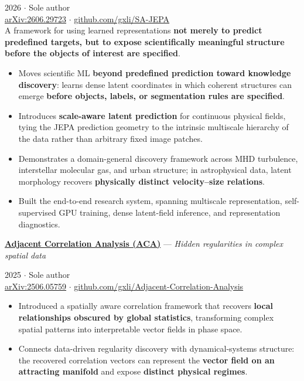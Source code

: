 \documentclass[10pt]{article}
\begin{document}
\hfill{\small\color{contactgray} 2026 $\cdot$ Sole author}\\[2pt]
{\small\color{contactgray} \href{https://arxiv.org/abs/2606.29723}{arXiv:2606.29723} $\cdot$ \href{https://github.com/gxli/SA-JEPA}{github.com/gxli/SA-JEPA}}\\[2pt]
A framework for using learned representations \textbf{not merely to predict predefined targets, but
to expose scientifically meaningful structure before the objects of interest are specified}.
\begin{itemize}
  \item Moves scientific ML \begingroup\setlength{\fboxsep}{1.2pt}\colorbox{accent!12}{\textbf{beyond predefined prediction toward knowledge
        discovery}}\endgroup: learns dense latent coordinates in which coherent structures can emerge
        \textbf{before objects, labels, or segmentation rules are specified}.
  \item Introduces \textbf{scale-aware latent prediction} for continuous physical fields, tying the
        JEPA prediction geometry to the intrinsic multiscale hierarchy of the data rather
        than arbitrary fixed image patches.
  \item Demonstrates a domain-general discovery framework across MHD turbulence,
        interstellar molecular gas, and urban structure; in astrophysical data, latent morphology
        recovers \textbf{physically distinct velocity--size relations}.
  \item Built the end-to-end research system, spanning multiscale
        representation, self-supervised GPU training, dense latent-field inference, and
        representation diagnostics.
\end{itemize}
\vspace{4pt}

\href{https://arxiv.org/abs/2506.05759}{\textbf{Adjacent Correlation Analysis (ACA)}} ---
\textit{Hidden regularities in complex spatial data}

\hfill{\small\color{contactgray} 2025 $\cdot$ Sole author}\\[2pt]
{\small\color{contactgray} \href{https://arxiv.org/abs/2506.05759}{arXiv:2506.05759} $\cdot$ \href{https://github.com/gxli/Adjacent-Correlation-Analysis}{github.com/gxli/Adjacent-Correlation-Analysis}}\\[2pt]
\begin{itemize}
  \item Introduced a spatially aware correlation framework that recovers \textbf{local relationships
        obscured by global statistics}, transforming complex spatial patterns into interpretable
        vector fields in phase space.
  \item Connects data-driven regularity discovery with dynamical-systems structure: the recovered
        correlation vectors can represent the \textbf{vector field on an attracting manifold} and
        expose \textbf{distinct physical regimes}.
\end{itemize}
\vspace{4pt}
\end{document}

